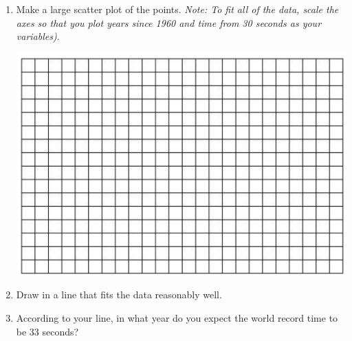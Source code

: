 \documentclass[12pt]{article}
\begin{document}
\begin{enumerate}
\begin{enumerate}
\item Make a large scatter plot of the points. \emph{Note: To fit all of the data, scale the axes so that you plot years since 1960 and time from 30 seconds as your variables)}. 

\vspace{.1in}
\begin{center}
 {\includegraphics [width = 6in] {../graphPaper}}
\end{center}
\vspace{.1in}

\item Draw in a line that fits the data reasonably well.
\item  According to your line, in what year do you expect the world record time to be 33 seconds?
\end{enumerate}

\end{enumerate}
\end{document}
